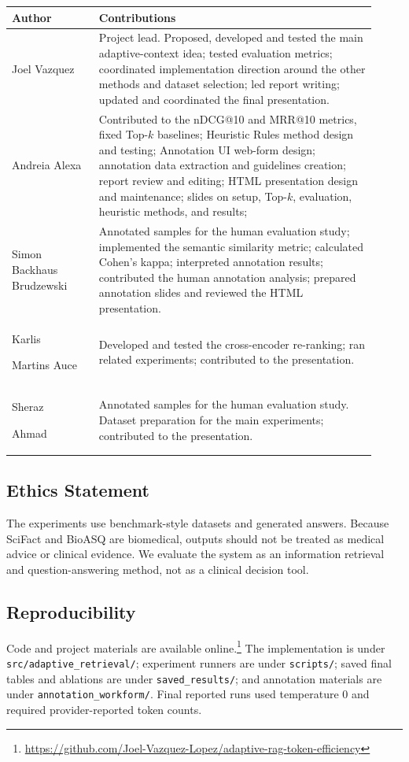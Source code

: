 \documentclass[11pt]{article}
\begin{document}
  \begin{center}
  \small
  \begin{tabular}{p{0.22\linewidth}p{0.70\linewidth}}
  \toprule
  Author & Contributions \\
  \midrule
  Joel Vazquez &
  Project lead. Proposed, developed and tested the main adaptive-context idea; 
  tested evaluation metrics; coordinated implementation
  direction around the other methods and dataset selection; 
  led report writing; 
  updated and coordinated the final presentation. \\
  \midrule
  Andreia Alexa &
  Contributed to the nDCG@10 and MRR@10 metrics, fixed Top-$k$ baselines; 
  Heuristic Rules method design and testing; 
  Annotation UI web-form design; annotation data extraction and guidelines creation; 
  report review and editing; HTML presentation design and maintenance; 
  slides on setup, Top-$k$, evaluation, heuristic methods, and results; \\
  \midrule
  Simon Backhaus Brudzewski &
  Annotated samples for the human evaluation study; implemented the semantic similarity metric; calculated
Cohen's kappa; interpreted annotation results; contributed the
human annotation analysis; prepared annotation slides and reviewed the HTML presentation.  \\
  \midrule
  Karlis 
  
  Martins Auce &
  Developed and tested the cross-encoder re-ranking; ran related experiments; 
  contributed to the presentation. \\
  \midrule
  Sheraz 
  
  Ahmad &
  Annotated samples for the human evaluation study. Dataset preparation for the main experiments; contributed to the presentation.
  \\
  \bottomrule
  \end{tabular}
  \end{center}

\subsection*{Ethics Statement}
The experiments use benchmark-style datasets and generated answers. Because SciFact and BioASQ are biomedical, outputs should not be treated as medical advice or clinical evidence. We evaluate the system as an information retrieval and question-answering method, not as a clinical decision tool.


\subsection*{Reproducibility}
Code and project materials are available online.\footnote{\url{https://github.com/Joel-Vazquez-Lopez/adaptive-rag-token-efficiency}} The implementation is under \texttt{src/adaptive\_retrieval/}; experiment runners are under \texttt{scripts/}; saved final tables and ablations are under \texttt{saved\_results/}; and annotation materials are under \texttt{annotation\_workform/}. Final reported runs used temperature 0 and required provider-reported token counts.
\end{document}
